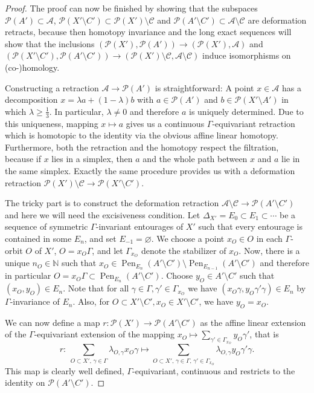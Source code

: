 \documentclass[pdftex]{sigma}
\numberwithin{equation}{section}
\theoremstyle{definition}
\newcommand{\N}{\mathbb{N}}
\newcommand{\cP}{\mathcal{P}}
\newcommand{\cA}{\mathcal{A}}
\newcommand{\cC}{\mathcal{C}}
\newcommand{\Diag}[1][]{{\Delta_{#1}}}
\DeclareMathOperator{\Pen}{Pen}
\begin{document}
\begin{proof}
The proof can now be finished by showing that the subspaces $\cP(A')\subset\cA$, $\cP(X'\setminus C')\subset\cP(X')\setminus\cC$ and $\cP(A'\setminus C')\subset \cA\setminus \cC$ are deformation retracts, because then homotopy invariance and the long exact sequences will show that the inclusions $(\cP(X'),\cP(A'))\to(\cP(X'),\cA)$ and $(\cP(X'\setminus C'),\cP(A'\setminus C'))\to(\cP(X')\setminus\cC,\cA\setminus\cC)$ induce isomorphisms on \mbox{(co-)}homology.

Constructing a retraction $\cA\to\cP(A')$ is straightforward: A point $x\in\cA$ has a decomposition $x=\lambda a+(1-\lambda) b$ with $a\in\cP(A')$ and $b\in\cP(X'\setminus A')$ in which $\lambda\geq \frac13$. In particular, $\lambda\not=0$ and therefore $a$ is uniquely determined. Due to this uniqueness, mapping $x\mapsto a$ gives us a continuous $\Gamma$-equivariant retraction which is homotopic to the identity via the obvious affine linear homotopy. Furthermore, both the retraction and the homotopy respect the filtration, because if $x$ lies in a simplex, then $a$ and the whole path between $x$ and $a$ lie in the same simplex. Exactly the same procedure provides us with a deformation retraction $\cP(X')\setminus\cC\to\cP(X'\setminus C')$.

The tricky part is to construct the deformation retraction $\cA\setminus \cC\to\cP(A'\setminus C')$ and here we will need the excisiveness condition. Let $\Diag[X']=E_0\subset E_1\subset \cdots$ be a sequence of symmetric $\Gamma$-invariant entourages of $X'$ such that every entourage is contained in some $E_n$, and set $E_{-1}=\varnothing$.
We choose a point $x_O\in O$ in each $\Gamma$-orbit $O$ of $X'$, $O=x_O\Gamma$, and let $\Gamma_{x_O}$ denote the stabilizer of $x_O$. Now, there is a unique $n_O\in\N$ such that $x_O\in \Pen_{E_{n}}(A'\setminus C')\setminus\Pen_{E_{n-1}}(A'\setminus C')$ and therefore in particular $O=x_O\Gamma\subset \Pen_{E_{n}}(A'\setminus C')$.
Choose $y_O\in A'\setminus C'$ such that $(x_O,y_O)\in E_n$. Note that for all $\gamma\in\Gamma,\gamma'\in\Gamma_{x_O}$ we have $(x_O\gamma,y_O\gamma'\gamma)\in E_n$ by $\Gamma$-invariance of $E_n$. Also, for $O\subset X'\setminus C', x_O\in X'\setminus C'$, we have $y_O= x_O$.

We can now define a map $r\colon\cP(X')\to\cP(A'\setminus C')$ as the affine linear extension of the $\Gamma$-equivariant extension of the mapping $x_O\mapsto \sum_{\gamma'\in\Gamma_{x_O}}y_O\gamma'$, that is
\[
r\colon\ \sum_{O\subset X',\,\gamma\in\Gamma}\lambda_{O,\gamma}x_O\gamma\mapsto \sum_{O\subset X',\,\gamma\in\Gamma,\,\gamma'\in\Gamma_{x_O}}\lambda_{O,\gamma}y_O\gamma'\gamma.
\]
This map is clearly well defined, $\Gamma$-equivariant, continuous and restricts to the identity on $\cP(A'\setminus C')$.


\end{proof}
\end{document}

